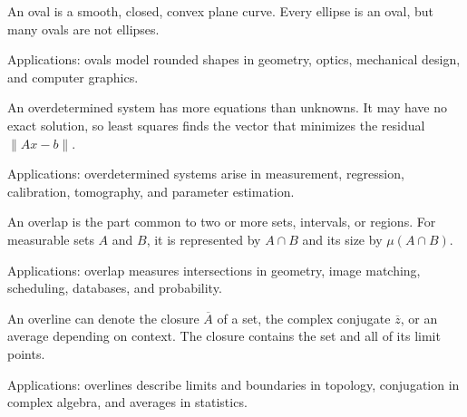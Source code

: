 An oval is a smooth, closed, convex plane curve. Every ellipse is an oval, but many ovals are not ellipses. \par\noindent Applications: ovals model rounded shapes in geometry, optics, mechanical design, and computer graphics.

An overdetermined system has more equations than unknowns. It may have no exact solution, so least squares finds the vector that minimizes the residual $\|Ax-b\|$. \par\noindent Applications: overdetermined systems arise in measurement, regression, calibration, tomography, and parameter estimation.

An overlap is the part common to two or more sets, intervals, or regions. For measurable sets $A$ and $B$, it is represented by $A\cap B$ and its size by $\mu(A\cap B)$. \par\noindent Applications: overlap measures intersections in geometry, image matching, scheduling, databases, and probability.

An overline can denote the closure $\overline A$ of a set, the complex conjugate $\overline z$, or an average depending on context. The closure contains the set and all of its limit points. \par\noindent Applications: overlines describe limits and boundaries in topology, conjugation in complex algebra, and averages in statistics.
